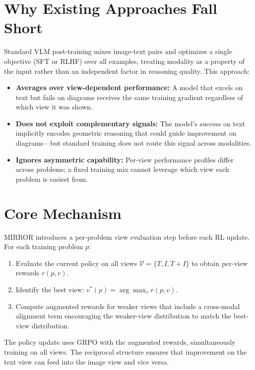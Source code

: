 \documentclass[10pt,twocolumn]{article}
\begin{document}
\section{Why Existing Approaches Fall Short}

Standard VLM post-training mixes image-text pairs and optimizes a
single objective (SFT or RLHF) over all examples, treating modality
as a property of the input rather than an independent factor in
reasoning quality. This approach:

\begin{itemize}[itemsep=2pt,parsep=0pt]
  \item \textbf{Averages over view-dependent performance:} A model
    that excels on text but fails on diagrams receives the same
    training gradient regardless of which view it was shown.
  \item \textbf{Does not exploit complementary signals:} The model's
    success on text implicitly encodes geometric reasoning that could
    guide improvement on diagrams---but standard training does not
    route this signal across modalities.
  \item \textbf{Ignores asymmetric capability:} Per-view performance
    profiles differ across problems; a fixed training mix cannot
    leverage which view each problem is easiest from.
\end{itemize}

\section{Core Mechanism}

MIRROR introduces a per-problem view evaluation step before each RL
update. For each training problem $p$:

\begin{enumerate}[itemsep=2pt,parsep=0pt]
  \item Evaluate the current policy on all views
    $\mathcal{V} = \{T, I, T\!+\!I\}$ to obtain per-view rewards
    $r(p, v)$.
  \item Identify the best view: $v^*(p) = \arg\max_v r(p, v)$.
  \item Compute augmented rewards for weaker views that include a
    cross-modal alignment term encouraging the weaker-view distribution
    to match the best-view distribution.
\end{enumerate}

The policy update uses GRPO with the augmented rewards, simultaneously
training on all views. The reciprocal structure ensures that
improvement on the text view can feed into the image view and vice
versa.
\end{document}
